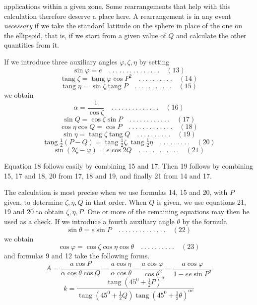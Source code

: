 %
applications within a given zone. Some rearrangements that help with this calculation therefore deserve a place here. A rearrangement is in any event \textit{necessary} if we take the standard latitude on the sphere in place of the one on the ellipsoid, that is, if we start from a given value of \(Q\) and calculate the other quantities from it.

If we introduce three auxiliary angles \(\varphi,\zeta,\eta\) by setting
\[
\sin\varphi=e \quad .\ .\ .\ .\ .\ .\ .\ .\ .\ .\ .\ .\ .\ .\ .\quad(13)
\]
\[
\operatorname{tang}\zeta=\operatorname{tang}\varphi\cos P^2 \quad .\ .\ .\ .\ .\ .\ .\ .\ .\ .\quad(14)
\]
\[
\operatorname{tang}\eta=\sin\zeta\operatorname{tang}P \quad .\ .\ .\ .\ .\ .\ .\ .\ .\ .\ .\quad(15)
\]
we obtain
\[
\alpha=\frac{1}{\cos\zeta} \quad .\ .\ .\ .\ .\ .\ .\ .\ .\ .\ .\ .\ .\ .\quad(16)
\]
\[
\sin Q=\cos\zeta\sin P \quad .\ .\ .\ .\ .\ .\ .\ .\ .\ .\ .\ .\quad(17)
\]
\[
\cos\eta\cos Q=\cos P \quad .\ .\ .\ .\ .\ .\ .\ .\ .\ .\ .\ .\ .\quad(18)
\]
\[
\sin\eta=\operatorname{tang}\zeta\operatorname{tang}Q \quad .\ .\ .\ .\ .\ .\ .\ .\ .\ .\quad(19)
\]
\[
\operatorname{tang}\tfrac{1}{2}(P-Q)=\operatorname{tang}\tfrac{1}{2}\zeta\mathord{.}\operatorname{tang}\tfrac{1}{2}\eta \quad .\ .\ .\ .\ .\ .\ .\ .\ .\quad(20)
\]
\[
\sin(2\zeta-\varphi)=e\cos2Q \quad .\ .\ .\ .\ .\ .\ .\ .\ .\ .\ .\ .\quad(21)
\]

Equation 18 follows easily by combining 15 and 17. Then 19 follows by combining 15, 17 and 18, 20 from 17, 18 and 19, and finally 21 from 14 and 17.

The calculation is most precise when we use formulas 14, 15 and 20, with \(P\) given, to determine \(\zeta,\eta,Q\) in that order. When \(Q\) is given, we use equations 21, 19 and 20 to obtain \(\zeta,\eta,P\). One or more of the remaining equations may then be used as a check. If we introduce a fourth auxiliary angle \(\theta\) by the formula
\[
\sin\theta=e\sin P \quad .\ .\ .\ .\ .\ .\ .\ .\ .\ .\ .\ .\ .\ .\quad(22)
\]
we obtain
\[
\cos\varphi=\cos\zeta\cos\eta\cos\theta \quad .\ .\ .\ .\ .\ .\ .\ .\ .\ .\quad(23)
\]
and formulas 9 and 12 take the following forms.
\[
A=\frac{a\cos P}{\alpha\cos\theta\cos Q}=\frac{a\cos\eta}{\alpha\cos\theta}=\frac{a\cos\varphi}{\cos\theta^2}=\frac{a\cos\varphi}{1-ee\sin P^2}
\]
\[
k=\frac{\operatorname{tang}(45^0+\frac{1}{2}P)^\alpha}{\operatorname{tang}(45^0+\frac{1}{2}Q)\operatorname{tang}(45^0+\frac{1}{2}\theta)^{\alpha e}}
\]
